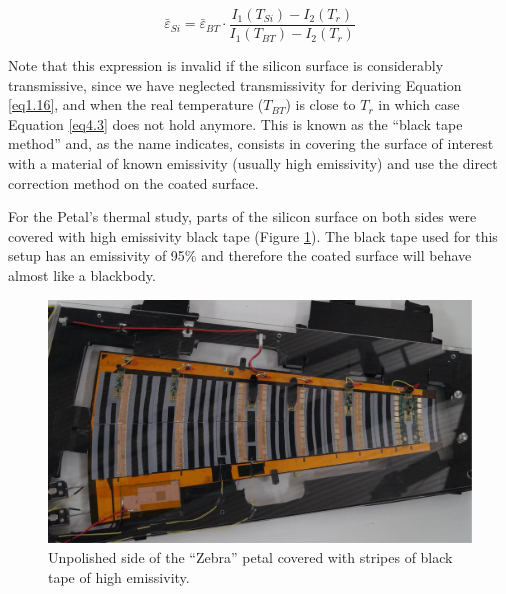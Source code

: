 		\begin{equation}\label{eq4.3}
		\bar{\varepsilon}_{Si} = \bar{\varepsilon}_{BT} \cdot \frac{I_{1}(T_{Si}) - I_{2}(T_{r})}{I_{1}(T_{BT}) - I_{2}(T_{r})}
		\end{equation}\bigskip
		
		Note that this expression is invalid if the silicon surface is considerably transmissive, since we have neglected transmissivity for deriving Equation \ref{eq1.16}, and when the real temperature ($T_{BT}$) is close to $T_{r}$ in which case Equation \ref{eq4.3} does not hold anymore. This is known as the “black tape method” and, as the name indicates, consists in covering the surface of interest with a material of known emissivity (usually high emissivity) and use the direct correction method on the coated surface.
		
		For the Petal’s thermal study, parts of the silicon surface on both sides were covered with high emissivity black tape (Figure \ref{fig4.1}). The black tape used for this setup has an emissivity of 95\% and therefore the coated surface will behave almost like a blackbody. 
		
		\begin{figure}[ht!]
			\centering
			\captionsetup{justification=centering,margin=2cm}
			\includegraphics[scale=0.40]{Figures/Chapter04/ZebraPetal.jpg}
			\caption{Unpolished side of the “Zebra” petal covered with stripes of black tape of high emissivity.}\label{fig4.1}
		\end{figure}
		

